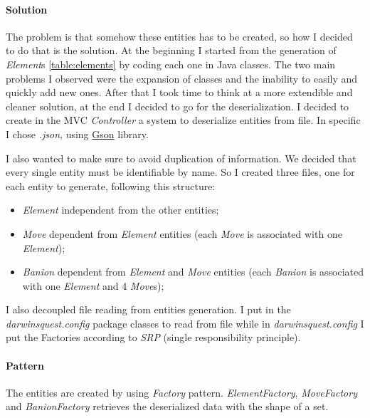 \documentclass[12pt, a4paper]{report}
\begin{document}
            \paragraph{Solution}

            The problem is that somehow these entities has to be created, so how I decided to do that is the solution.
            At the beginning I started from the generation of \emph{Element}s \ref{table:elements} by coding each one in Java classes.
            The two main problems I observed were the expansion of classes and the inability to easily and quickly add new ones.
            After that I took time to think at a more extendible and cleaner solution, at the end I decided to go for the deserialization.
            I decided to create in the MVC \emph{Controller} a system to deserialize entities from file.
            In specific I chose \textit{.json}, using \href{https://github.com/google/gson}{Gson} library.
            
            I also wanted to make sure to avoid duplication of information.
            We decided that every single entity must be identifiable by name.
            So I created three files, one for each entity to generate, following this structure:
            \begin{itemize}
                \item \emph{Element} \textrightarrow independent from the other entities;
                \item \emph{Move} \textrightarrow dependent from \emph{Element} entities (each \emph{Move} is associated with one \emph{Element});
                \item \emph{Banion} \textrightarrow dependent from \emph{Element} and \emph{Move} entities (each \emph{Banion} is associated with one \emph{Element} and 4 \emph{Move}s);
            \end{itemize}

            I also decoupled file reading from entities generation.
            I put in the \textit{darwinsquest.config} package classes to read from file while in \textit{darwinsquest.config} I put the Factories according to \emph{SRP} (single responsibility principle).

            \paragraph{Pattern}

            The entities are created by using \emph{Factory} pattern.
            \emph{ElementFactory}, \emph{MoveFactory} and \emph{BanionFactory} retrieves the deserialized data with the shape of a set.
\end{document}
